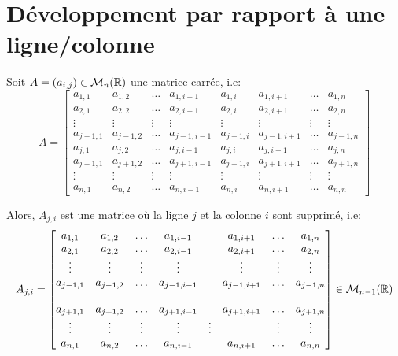 \section{Développement par rapport à une ligne/colonne}
\begin{definition}\label{def:matrice-ligne-colonne-supprime}
    Soit $A = (a_{i, j}) \in \mathcal{M}_n(\mathbb{R})$ une matrice carrée, i.e:
    \[
        A = 
        \begin{bmatrix} 
            a_{1, 1} & a_{1, 2} & \ldots & a_{1, i - 1} & a_{1, i} & a_{1, i+1} & \ldots & a_{1, n} \\
            a_{2, 1} & a_{2, 2} & \ldots & a_{2, i - 1} & a_{2, i} & a_{2, i+1} & \ldots & a_{2, n} \\
            \vdots   & \vdots   & \vdots & \vdots       & \vdots   & \vdots     & \vdots & \vdots \\
            a_{j-1, 1} & a_{j-1, 2} & \ldots & a_{j-1, i - 1} & a_{j-1, i} & a_{j-1, i+1} & \ldots & a_{j-1, n} \\
            a_{j, 1} & a_{j, 2} & \ldots & a_{j, i - 1} & a_{j, i} & a_{j, i+1} & \ldots & a_{j, n} \\
            a_{j+1, 1} & a_{j+1, 2} & \ldots & a_{j+1, i - 1} & a_{j+1, i} & a_{j+1, i+1} & \ldots & a_{j+1, n} \\
            \vdots   & \vdots   & \vdots & \vdots       & \vdots   & \vdots     & \vdots & \vdots \\
            a_{n, 1} & a_{n, 2} & \ldots & a_{n, i - 1} & a_{n, i} & a_{n, i+1} & \ldots & a_{n, n} 
        \end{bmatrix} 
    \] 

    Alors, $A_{j, i}$ est une matrice où la ligne $j$ et la colonne  $i$ sont supprimé, i.e:
    \[
        A_{j, i} = 
        \begin{bmatrix} 
            a_{1, 1} & a_{1, 2} & \ldots & a_{1, i - 1} & & a_{1, i+1} & \ldots & a_{1, n} \\
            a_{2, 1} & a_{2, 2} & \ldots & a_{2, i - 1} & & a_{2, i+1} & \ldots & a_{2, n} \\
            \vdots   & \vdots   & \vdots & \vdots       & & \vdots     & \vdots & \vdots \\
           a_{j-1, 1} & a_{j-1, 2} & \ldots & a_{j-1, i - 1} & & a_{j-1, i+1} & \ldots & a_{j-1, n} \\
             & & & & & & & \\
            a_{j+1, 1} & a_{j+1, 2} & \ldots & a_{j+1, i - 1} & & a_{j+1, i+1} & \ldots & a_{j+1, n} \\
            \vdots   & \vdots   & \vdots & \vdots       & \vdots   & & \vdots & \vdots \\
            a_{n, 1} & a_{n, 2} & \ldots & a_{n, i - 1} & & a_{n, i+1} & \ldots & a_{n, n} 
        \end{bmatrix} \in \mathcal{M}_{n-1}(\mathbb{R})
    \] 
\end{definition}

